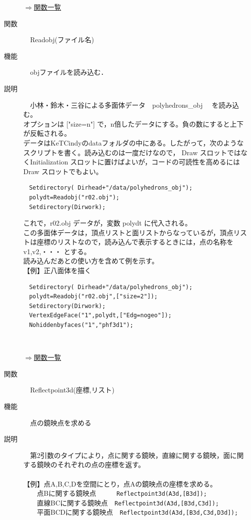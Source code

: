 \documentclass[papersize,a4paper,12pt,uplatex]{jsarticle}
\begin{document}
\begin{description}
\begin{flushright} \hyperlink{functionlist3d}{$\Rightarrow$関数一覧}\end{flushright}

\hypertarget{readobj}{}
\item[関数]　Readobj(ファイル名)
\item[機能]　objファイルを読み込む．
\item[説明]　小林・鈴木・三谷による多面体データ　polyhedrons\_obj 　を読み込む。\\
オプションは ["size=n"]  で，n倍したデータにする。負の数にすると上下が反転される。\\
データはKeTCindyのdataフォルダの中にある。したがって，次のようなスクリプトを書く。読み込むのは一度だけなので， Draw スロットではなくInitialization スロットに置けばよいが，コードの可読性を高めるには Draw スロットでもよい。
\begin{verbatim}
　Setdirectory( Dirhead+"/data/polyhedrons_obj");
　polydt=Readobj("r02.obj");
　Setdirectory(Dirwork);
\end{verbatim}
これで，r02.obj データが，変数 polydt に代入される。\\
この多面体データは，頂点リストと面リストからなっているが，頂点リストは座標のリストなので，読み込んで表示するときには，点の名称を v1,v2,・・・ とする。\\
読み込んだあとの使い方を含めて例を示す。\\

【例】正八面体を描く
\begin{verbatim}
　Setdirectory( Dirhead+"/data/polyhedrons_obj");
　polydt=Readobj("r02.obj",["size=2"]);
　Setdirectory(Dirwork);
　VertexEdgeFace("1",polydt,["Edg=nogeo"]);
　Nohiddenbyfaces("1","phf3d1");
\end{verbatim}
　　　

\begin{flushright} \hyperlink{functionlist3d}{$\Rightarrow$関数一覧}\end{flushright}

\hypertarget{reflectpoint3d}{}
\item[関数]　Reflectpoint3d(座標,リスト)
\item[機能]　点の鏡映点を求める
\item[説明]　第2引数のタイプにより，点に関する鏡映，直線に関する鏡映，面に関する鏡映のそれぞれの点の座標を返す。\\
　\\
【例】点A,B,C,Dを空間にとり，点Aの鏡映点の座標を求める。\\
　　点Bに関する鏡映点　　　\verb|Reflectpoint3d(A3d,[B3d]);|\\
　　直線BCに関する鏡映点　\verb|Reflectpoint3d(A3d,[B3d,C3d]);|\\
　　平面BCDに関する鏡映点　\verb|Reflectpoint3d(A3d,[B3d,C3d,D3d]);|\\


\end{description}
\end{document}

